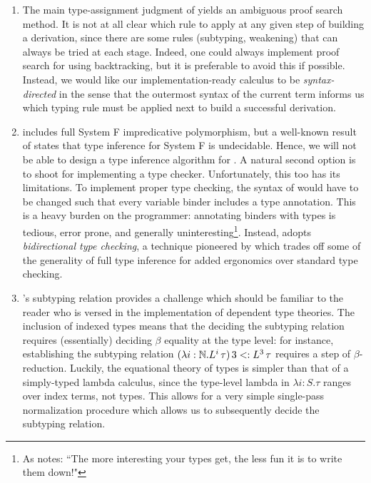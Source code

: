\begin{enumerate}
  \item The main type-assignment judgment of \dlambdaamor yields an ambiguous proof search method. It is not at all clear which rule to apply at any given step of building a derivation, since there are some rules (subtyping, weakening) that can always be tried at each stage. Indeed, one could always implement proof search for \dlambdaamor using backtracking, but it is preferable to avoid this if possible. Instead, we would like our implementation-ready calculus \bilambdaamor to be \textit{syntax-directed} in the sense that the outermost syntax of the current term informs us which typing rule must be applied next to build a successful derivation. 
  
  \item \dlambdaamor includes full System F impredicative polymorphism, but a well-known result of \citet{wells:pal91} states that type inference for System F is undecidable. Hence, we will not be able to design a type inference algorithm for \dlambdaamor. A natural second option is to shoot for implementing a type checker. Unfortunately, this too has its limitations. To implement proper type checking, the syntax of \dlambdaamor would have to be changed such that every variable binder includes a type annotation. This is a heavy burden on the programmer: annotating binders with types is tedious, error prone, and generally uninteresting\footnote{
As \citet{pierce:lics03} notes: ``The more interesting your types get, the less fun it is to write them down!"
  }. Instead, \bilambdaamor adopts \textit{bidirectional type checking}, a technique pioneered by \citet{pierce-and-turner:lti} which trades off some of the generality of full type inference for added ergonomics over standard type checking.
  
  \item \dlambdaamor's subtyping relation provides a challenge which should be familiar to the reader who is versed in the implementation of dependent type theories. The inclusion of indexed types means that the deciding the subtyping relation requires (essentially) deciding $\beta$ equality at the type level: for instance, establishing the subtyping relation $(\lambda i : \mathbb{N}. L^i\, \tau) \, 3 <: L^3 \, \tau$ requires a step of $\beta$-reduction. Luckily, the equational theory of types is simpler than that of a simply-typed lambda calculus, since the type-level lambda in \dlambdaamor $\lambda i : S. \tau$ ranges over index terms, not types. This allows for a very simple single-pass normalization procedure which allows us to subsequently decide the subtyping relation.
  

\end{enumerate}
